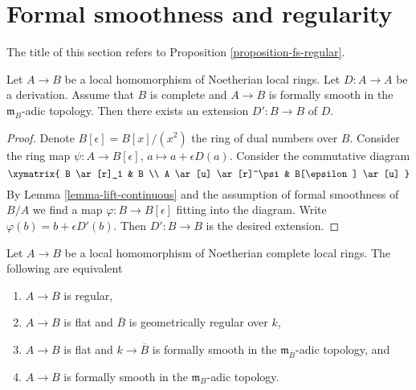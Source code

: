 \section{Formal smoothness and regularity}
\label{section-fs-regular}

\noindent
The title of this section refers to Proposition \ref{proposition-fs-regular}.

\begin{lemma}
\label{lemma-lift-derivation-through-fs}
Let $A \to B$ be a local homomorphism of Noetherian local rings.
Let $D : A \to A$ be a derivation. Assume that $B$ is complete
and $A \to B$ is formally smooth in the $\mathfrak m_B$-adic topology.
Then there exists an extension $D' : B \to B$ of $D$.
\end{lemma}

\begin{proof}
Denote $B[\epsilon] = B[x]/(x^2)$ the ring of dual numbers over $B$.
Consider the ring map $\psi : A \to B[\epsilon]$,
$a \mapsto a + \epsilon D(a)$.
Consider the commutative diagram
$$
\xymatrix{
B \ar[r]_1 & B \\
A \ar[u] \ar[r]^\psi & B[\epsilon] \ar[u]
}
$$
By Lemma \ref{lemma-lift-continuous} and the assumption of formal
smoothness of $B/A$ we find a map $\varphi : B \to B[\epsilon]$ fitting into
the diagram. Write $\varphi(b) = b + \epsilon D'(b)$. Then $D' : B \to B$
is the desired extension.
\end{proof}

\begin{proposition}
\label{proposition-fs-regular}
Let $A \to B$ be a local homomorphism of Noetherian complete local rings.
The following are equivalent
\begin{enumerate}
\item $A \to B$ is regular,
\item $A \to B$ is flat and $\overline{B}$ is geometrically regular
over $k$,
\item $A \to B$ is flat and $k \to \overline{B}$ is formally smooth
in the $\mathfrak m_{\overline{B}}$-adic topology, and
\item $A \to B$ is formally smooth in the $\mathfrak m_B$-adic
topology.
\end{enumerate}
\end{proposition}

